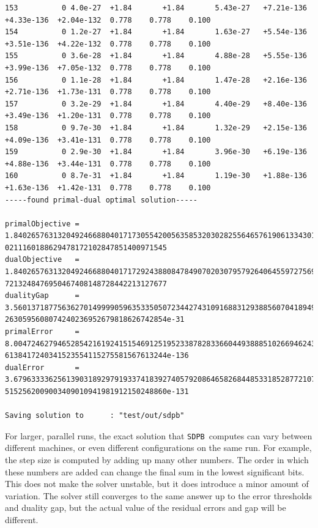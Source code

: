\documentclass[12pt]{article}
\numberwithin{equation}{section}
\newcommand\SDPB{\texttt{SDPB}}
\begin{document}
\begin{lstlisting}
153          0 4.0e-27  +1.84       +1.84       5.43e-27   +7.21e-136  +4.33e-136  +2.04e-132  0.778    0.778    0.100
154          0 1.2e-27  +1.84       +1.84       1.63e-27   +5.54e-136  +3.51e-136  +4.22e-132  0.778    0.778    0.100
155          0 3.6e-28  +1.84       +1.84       4.88e-28   +5.55e-136  +3.99e-136  +7.05e-132  0.778    0.778    0.100
156          0 1.1e-28  +1.84       +1.84       1.47e-28   +2.16e-136  +2.71e-136  +1.73e-131  0.778    0.778    0.100
157          0 3.2e-29  +1.84       +1.84       4.40e-29   +8.40e-136  +3.49e-136  +1.20e-131  0.778    0.778    0.100
158          0 9.7e-30  +1.84       +1.84       1.32e-29   +2.15e-136  +4.09e-136  +3.41e-131  0.778    0.778    0.100
159          0 2.9e-30  +1.84       +1.84       3.96e-30   +6.19e-136  +4.88e-136  +3.44e-131  0.778    0.778    0.100
160          0 8.7e-31  +1.84       +1.84       1.19e-30   +1.88e-136  +1.63e-136  +1.42e-131  0.778    0.778    0.100
-----found primal-dual optimal solution-----

primalObjective = 1.84026576313204924668804017173055420056358532030282556465761906133430166726537336826049865612094019
0211160188629478172102847851400971545
dualObjective   = 1.84026576313204924668804017172924388084784907020307957926406455972756967820389551729116356865203683
7213248476950467408148728442213127677
dualityGap      = 3.56013718775636270149999059635335050723442743109168831293885607041894974620853522385695676694435617
2630595608074240236952679818626742854e-31
primalError     = 8.00472462794652854216192415154691251952338782833660449388851026694624386819579233719251965820695076
6138417240341523554115275581567613244e-136
dualError       = 3.67963333625613903189297919337418392740579208646582684485331852877210732905668816990827126132539445
5152562009003409010941981912150248860e-131

Saving solution to      : "test/out/sdpb"
\end{lstlisting}

For larger, parallel runs, the exact solution that \SDPB\ computes can
vary between different machines, or even different configurations on
the same run.  For example, the step size is computed by adding up
many other numbers.  The order in which these numbers are added can
change the final sum in the lowest significant bits.  This does not
make the solver unstable, but it does introduce a minor amount of
variation.  The solver still converges to the same answer up to the
error thresholds and duality gap, but the actual value of the residual
errors and gap will be different.
\end{document}
